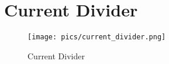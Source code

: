 \documentclass[main]{subfiles}
\begin{document}
\section{Current Divider}
\begin{figure}[htbp]
  \centering
  \texttt{[image: pics/current\_divider.png]}
  \caption{Current Divider \cite{lec6}}
  \label{fig:current_divider}
\end{figure}

\end{document}
